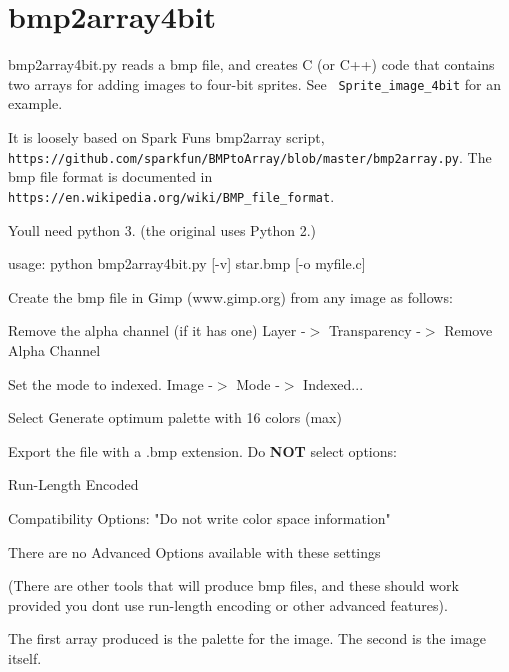 \chapter{bmp2array4bit}
\label{md_lib_2_t_f_t__e_s_p_i-master_2_tools_2bmp2array4bit_2_r_e_a_d_m_e}
\label{md_lib_2_t_f_t__e_s_p_i-master_2_tools_2bmp2array4bit_2_r_e_a_d_m_e_autotoc_md21}%


bmp2array4bit.\+py reads a bmp file, and creates C (or C++) code that contains two arrays for adding images to four-\/bit sprites. See {\texttt{ Sprite\+\_\+image\+\_\+4bit}} for an example.

It is loosely based on Spark Fun\textquotesingle{}s bmp2array script, {\texttt{ https\+://github.\+com/sparkfun/\+BMPto\+Array/blob/master/bmp2array.\+py}}. The bmp file format is documented in {\texttt{ https\+://en.\+wikipedia.\+org/wiki/\+BMP\+\_\+file\+\_\+format}}.

You\textquotesingle{}ll need python 3. (the original uses Python 2.)

{\ttfamily usage\+: python bmp2array4bit.\+py [-\/v] star.\+bmp [-\/o myfile.\+c]}

Create the bmp file in Gimp (www.\+gimp.\+org) from any image as follows\+:


\begin{DoxyItemize}
\item Remove the alpha channel (if it has one) Layer -\/$>$ Transparency -\/$>$ Remove Alpha Channel
\item Set the mode to indexed. Image -\/$>$ Mode -\/$>$ Indexed...
\item Select Generate optimum palette with 16 colors (max)
\item Export the file with a .bmp extension. Do {\bfseries{NOT}} select options\+:
\begin{DoxyItemize}
\item Run-\/\+Length Encoded
\item Compatibility Options\+: "{}\+Do not write color space information"{}
\item There are no Advanced Options available with these settings
\end{DoxyItemize}
\end{DoxyItemize}

(There are other tools that will produce bmp files, and these should work provided you don\textquotesingle{}t use run-\/length encoding or other advanced features).

The first array produced is the palette for the image. The second is the image itself. 